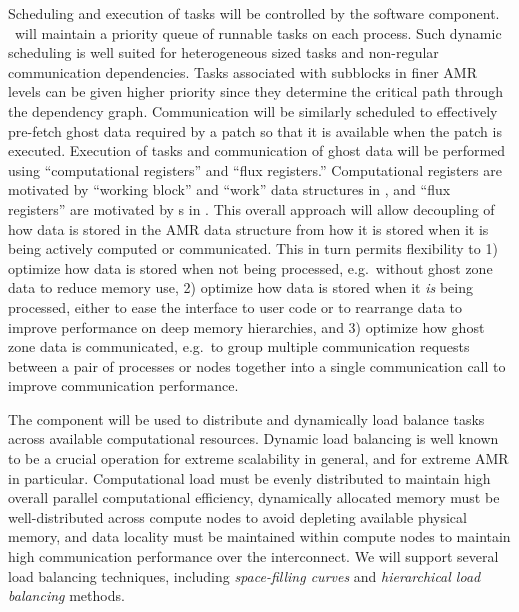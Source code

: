 \documentclass[11pt,letterpaper]{article}
\begin{document}
%
Scheduling and execution of tasks will be controlled by the
 software component.  \cello\ will maintain a priority
queue of runnable tasks on each process.  Such dynamic scheduling is
well suited for heterogeneous sized tasks and non-regular
communication dependencies. Tasks associated with subblocks in finer
AMR levels can be given higher priority since they determine the
critical path through the dependency graph.  Communication will be
similarly scheduled to effectively pre-fetch ghost data required by a
patch so that it is available when the patch is executed.
%
Execution of tasks and communication
of ghost data will be performed using ``computational registers'' and
``flux registers.''  Computational registers are motivated by
``working block'' and ``work'' data structures in \paramesh, and
``flux registers'' are motivated by s in
\chombo.  This overall approach will allow decoupling of how data is
stored in the AMR data structure from how it is stored when it is
being actively computed or communicated.  This in turn permits
flexibility to 1) optimize how data is stored when not being
processed, e.g.~without ghost zone data to reduce memory use, 2)
optimize how data is stored when it \textit{is} being processed,
either to ease the interface to user code or to rearrange data to
improve performance on deep memory hierarchies, and 3) optimize how
ghost zone data is communicated, e.g.~to group multiple communication
requests between a pair of processes or nodes together into a single
communication call to improve communication performance.

%
The  component will be used to distribute and
dynamically load balance tasks across available computational
resources.  Dynamic load balancing is well known to be a crucial
operation for extreme scalability in general, and for extreme AMR in
particular.  Computational load must be evenly distributed to maintain
high overall parallel computational efficiency, dynamically allocated
memory must be well-distributed across compute nodes to avoid
depleting available physical memory, and data locality must be
maintained within compute nodes to maintain high communication
performance over the interconnect.  We will support several load
balancing techniques, including \textit{space-filling curves} and
\textit{hierarchical load balancing} methods.
\end{document}
